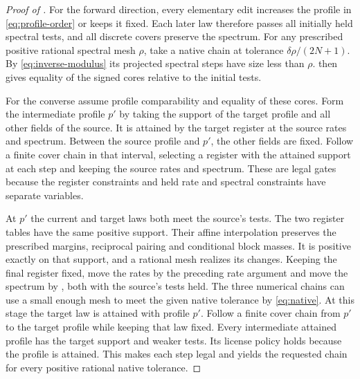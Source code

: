 \begin{proof}[Proof of ]
For the forward direction, every elementary edit increases the profile
in \eqref{eq:profile-order} or keeps it fixed. Each later law therefore
passes all initially held spectral tests, and all discrete covers preserve
the spectrum. For any prescribed positive rational spectral mesh
\(\rho\), take a native chain at tolerance
\(\delta\rho/(2N+1)\). By \eqref{eq:inverse-modulus} its projected spectral
steps have size less than \(\rho\).  then gives equality
of the signed cores relative to the initial tests.

For the converse assume profile comparability and equality of these
cores. Form the intermediate profile \(p'\) by taking the support
of the target profile and all other fields of the source. It is attained
by the target register at the source rates and spectrum. Between the
source profile and \(p'\), the other fields are fixed. Follow a finite
cover chain in that interval, selecting a register with the attained
support at each step and keeping the source rates and spectrum. These
are legal gates because the register constraints and held rate and spectral
constraints have separate variables.

At \(p'\) the current and target laws both meet the source's tests.
The two register tables have the same positive support. Their affine
interpolation preserves the prescribed margins, reciprocal pairing and
conditional block masses. It is positive exactly on that support, and a
rational mesh realizes its changes. Keeping the final register fixed, move
the rates by the preceding rate argument and move the spectrum by
, both with the source's tests held. The three numerical
chains can use a small enough mesh to meet the given native tolerance
by \eqref{eq:native}. At this stage the target law is attained with profile
\(p'\). Follow a finite cover chain from \(p'\) to the target profile
while keeping that law fixed. Every intermediate attained profile has
the target support and weaker tests. Its license policy holds because
the profile is attained. This makes each step legal and yields the
requested chain for every positive rational native tolerance.
\end{proof}

